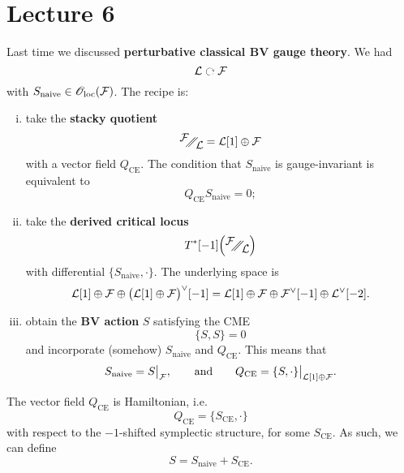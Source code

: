 \chapter{Lecture 6}

Last time we discussed \textbf{perturbative classical BV gauge theory}. We had
\begin{equation*}
  \Lcal \acts \Fcal
\end{equation*}
with $S_{\text{naive}} \in \mathscr{O}_{\text{loc}}(\mathcal{F})$. The recipe is:
\begin{enumerate}[i)]
  \item take the \textbf{stacky quotient}
  \begin{equation*}
    \doublequotient{\Fcal}{\Lcal} = \Lcal[1] \oplus \Fcal
  \end{equation*}
  with a vector field $Q_{\text{CE}}$.
  The condition that $S_{\text{naive}}$ is gauge-invariant is equivalent to
  \begin{equation*}
    Q_{\text{CE}} S_{\text{naive}} = 0;
  \end{equation*}
  \item take the \textbf{derived critical locus}
  \begin{equation*}
    T^* [-1] \Bigl( \doublequotient{\Fcal}{\Lcal} \Bigr)
  \end{equation*}
  with differential $\{ S_{\text{naive}}, \cdot \}$.
  The underlying space is
  \begin{equation*}
    \mathcal{L}[1] \oplus \mathcal{F} \oplus \bigl( \mathcal{L}[1] \oplus \mathcal{F} \bigr)^{\vee}[-1]
    =\mathcal{L} [1] \oplus \mathcal{F} \oplus \mathcal{F}^{\vee}[-1] \oplus \mathcal{L}^{\vee}[-2].
  \end{equation*}
  \item obtain the \textbf{BV action} $S$ satisfying the CME
  \begin{equation*}
    \{ S, S \} = 0
  \end{equation*}
  and incorporate (somehow) $S_{\text{naive}}$ and $Q_{\text{CE}}$.
  This means that
  \begin{equation*}
    S_{\text{naive}} = S \big|_{\mathcal{F}},
    \qquad \text{and} \qquad
    Q_{\text{CE}} = \{ S, \cdot \} \big|_{\mathcal{L}[1] \oplus \mathcal{F}}.
  \end{equation*}
\end{enumerate}

\begin{fact}
  The vector field $Q_{\text{CE}}$ is Hamiltonian, i.e.
  \begin{equation*}
    Q_{\text{CE}} = \{ S_{\text{CE}}, \cdot \}
  \end{equation*}
  with respect to the $-1$-shifted symplectic structure, for some $S_{\text{CE}}$.
  As such, we can define
  \begin{equation*}
    S = S_{\text{naive}} + S_{\text{CE}}.
  \end{equation*}
\end{fact}


